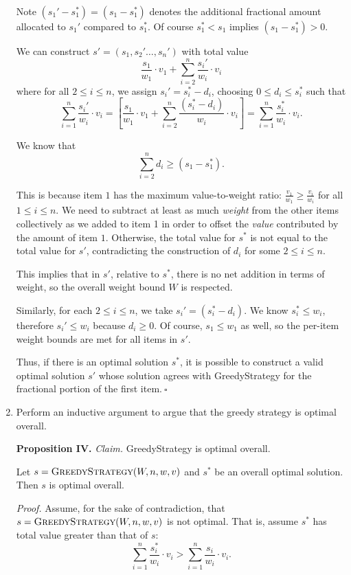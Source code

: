 \begin{enumerate}
\begin{solution}
Note $(s_1'-s_1^*)=(s_1-s_1^*)$ denotes the additional fractional amount allocated to $s_1'$ compared to $s_1^*$. Of course $s_1^*<s_1$ implies $(s_1-s_1^*)>0$.

We can construct $s'=(s_1,s_2'\dots,s_n')$ with total value
\[\frac{s_1}{w_1}\cdot v_1+\sum_{i=2}^n{\frac{s_i'}{w_i}\cdot v_i}\]
where for all $2\leq i\leq n$, we assign $s_i'=s_i^*-d_i$, choosing $0\leq d_i\leq s_i^*$ such that
\[\sum_{i=1}^n\frac{s_i'}{w_i}\cdot v_i=\left[\frac{s_1}{w_1}\cdot v_1+\sum_{i=2}^n\frac{(s_i^*-d_i)}{w_i}\cdot v_i\right]=\sum_{i=1}^n\frac{s_i^*}{w_i}\cdot v_i.\]

We know that
\[\sum_{i=2}^n{d_i}\geq (s_1-s_1^*).\]

This is because item $1$ has the maximum value-to-weight ratio: $\frac{v_1}{w_1}\geq\frac{v_i}{w_i}$ for all $1\leq i\leq n$. We need to subtract at least as much \textit{weight} from the other items collectively as we added to item 1 in order to offset the \textit{value} contributed by the amount of item $1$. Otherwise, the total value for $s^*$ is not equal to the total value for $s'$, contradicting the construction of $d_i$ for some $2\leq i\leq n$.

This implies that in $s'$, relative to $s^*$, there is no net addition in terms of weight, so the overall weight bound $W$ is respected. 

Similarly, for each $2\leq i\leq n$, we take $s_i'=(s_i^*-d_i)$. We know $s_i^*\leq w_i$, therefore $s_i'\leq w_i$ because $d_i\geq 0$. Of course, $s_1\leq w_1$ as well, so the per-item weight bounds are met for all items in $s'$.

Thus, if there is an optimal solution $s^*$,  it is possible to construct a valid optimal solution $s'$ whose solution agrees with {\sc GreedyStrategy} for the fractional portion of the first item.$~\square$
\end{solution}
\newpage
\item Perform an inductive argument to argue that the greedy strategy is optimal overall.
\begin{solution}
\textbf{Proposition IV. }\textit{Claim. }{\sc GreedyStrategy} is optimal overall.

Let $s=\textsc{GreedyStrategy}(W,n,w,v)$ and $s^*$ be an overall optimal solution. Then $s$ is optimal overall.

\textit{Proof. }Assume, for the sake of contradiction, that $s=\textsc{GreedyStrategy}(W,n,w,v)$ is not optimal. That is, assume $s^*$ has total value greater than that of $s$:\[\sum_{i=1}^n\frac{s_i^*}{w_i}\cdot v_i>\sum_{i=1}^n\frac{s_i}{w_i}\cdot v_i.\]


\end{solution}
\end{enumerate}
